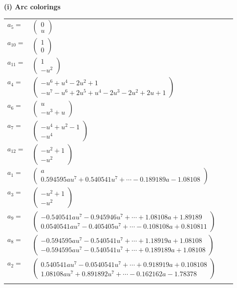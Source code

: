 \documentclass[1p]{elsarticle_modified}
\theoremstyle{definition}
\begin{document}
\flushleft \textbf{(i) Arc colorings}\\
\begin{tabular}{m{7pt} m{180pt} m{7pt} m{180pt} }
\flushright $a_{5}=$&$\begin{pmatrix}0\\u\end{pmatrix}$ \\
\flushright $a_{10}=$&$\begin{pmatrix}1\\0\end{pmatrix}$ \\
\flushright $a_{11}=$&$\begin{pmatrix}1\\- u^2\end{pmatrix}$ \\
\flushright $a_{4}=$&$\begin{pmatrix}- u^6+u^4-2 u^2+1\\- u^7- u^6+2 u^5+u^4-2 u^3-2 u^2+2 u+1\end{pmatrix}$ \\
\flushright $a_{6}=$&$\begin{pmatrix}u\\- u^3+u\end{pmatrix}$ \\
\flushright $a_{7}=$&$\begin{pmatrix}- u^4+u^2-1\\- u^4\end{pmatrix}$ \\
\flushright $a_{12}=$&$\begin{pmatrix}- u^2+1\\- u^2\end{pmatrix}$ \\
\flushright $a_{1}=$&$\begin{pmatrix}a\\0.594595 a u^{7}+0.540541 u^{7}+\cdots-0.189189 a-1.08108\end{pmatrix}$ \\
\flushright $a_{3}=$&$\begin{pmatrix}- u^2+1\\- u^2\end{pmatrix}$ \\
\flushright $a_{9}=$&$\begin{pmatrix}-0.540541 a u^{7}-0.945946 u^{7}+\cdots+1.08108 a+1.89189\\0.0540541 a u^{7}-0.405405 u^{7}+\cdots-0.108108 a+0.810811\end{pmatrix}$ \\
\flushright $a_{8}=$&$\begin{pmatrix}-0.594595 a u^{7}-0.540541 u^{7}+\cdots+1.18919 a+1.08108\\-0.594595 a u^{7}-0.540541 u^{7}+\cdots+0.189189 a+1.08108\end{pmatrix}$ \\
\flushright $a_{2}=$&$\begin{pmatrix}0.540541 a u^{7}-0.0540541 u^{7}+\cdots+0.918919 a+0.108108\\1.08108 a u^{7}+0.891892 u^{7}+\cdots-0.162162 a-1.78378\end{pmatrix}$\\&\end{tabular}
\end{document}
